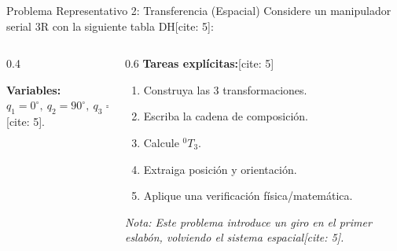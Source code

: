 \documentclass[aspectratio=169, table, xcdraw]{beamer}
\begin{document}
\begin{frame}{Problema Representativo 2: Transferencia (Espacial)}
    Considere un manipulador serial 3R con la siguiente tabla DH[cite: 5]:
    
    \begin{columns}
        \begin{column}{0.4\textwidth}
            \vspace{0.3cm}
            
            \textbf{Variables:} \\
            $q_1=0^\circ, \ q_2=90^\circ, \ q_3=-90^\circ$[cite: 5].
        \end{column}
        
        \begin{column}{0.6\textwidth}
            \textbf{Tareas explícitas:}[cite: 5]
            \begin{enumerate}
                \item Construya las 3 transformaciones.
                \item Escriba la cadena de composición.
                \item Calcule ${}^0T_3$.
                \item Extraiga posición y orientación.
                \item Aplique una verificación física/matemática.
            \end{enumerate}
            \textit{Nota: Este problema introduce un giro en el primer eslabón, volviendo el sistema espacial[cite: 5].}
        \end{column}
    \end{columns}
\end{frame}
\end{document}
